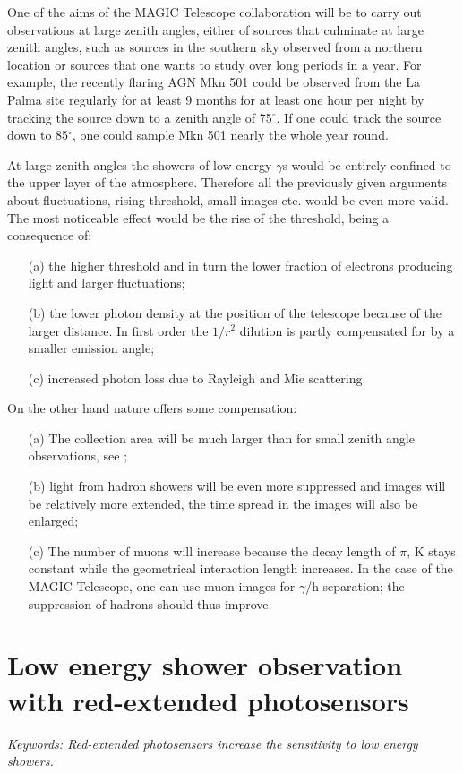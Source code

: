\par\medskip One of the aims of the MAGIC Telescope collaboration
will be to carry out observations
at large zenith angles, either of 
sources that culminate at large zenith angles, such as sources
in the southern sky observed 
from a northern location or sources that one wants to study
over long periods in a year. For 
example, the recently flaring AGN Mkn 501 could be observed
from the La Palma site 
regularly for at least 9 months for at least one hour
per night by tracking the source 
down to a  zenith angle of 75$^\circ$. If one could track the source
down to 85$^\circ$, one could sample Mkn 501 
nearly the whole year round.

At large zenith angles the showers of low energy $\gamma$s would 
be entirely confined to the upper 
layer of the atmosphere. Therefore all the previously given
arguments about fluctuations, 
rising threshold, small images etc. would be even more valid.
The most noticeable effect would
be the rise of the threshold, being a consequence of:
\begin{itemize}
\item[(a)]
the higher \Cerenkov threshold and in turn the lower fraction 
of electrons producing light 
and larger fluctuations;
\item[(b)]
the lower photon density at the position of the telescope because
of the larger distance. In first 
order the $1/r^2$ dilution is partly compensated for by a smaller
\Cerenkov emission angle; 
\item[(c)]
increased photon loss due to Rayleigh and Mie scattering.
\end{itemize}
On the other hand nature offers some compensation:
\begin{itemize}
\item[(a)] 
The collection area will be much larger than for small zenith 
angle observations, see \cite{sommers:87};
\item[(b)]
\Cerenkov light from hadron showers will be even more 
suppressed and images will be 
relatively more extended, the time spread in the 
images will also be enlarged;
\item[(c)]
The number of muons will increase because the decay 
length of $\pi$, K stays constant while 
the geometrical interaction length increases. In the case
of the MAGIC Telescope, one 
can use muon images for $\gamma$/h 
separation; the suppression of hadrons should thus improve.
\end{itemize}

\section{\sloppy Low energy shower observation with 
red-extended photosensors}
\par\medskip
{\it Keywords: Red-extended photosensors increase the sensitivity to low
energy showers.}

